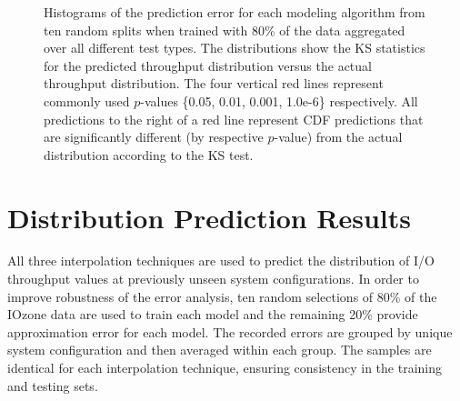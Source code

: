 
\begin{figure}
  \centering
  \caption{Histograms of the prediction error for each modeling algorithm from ten random splits when trained with 80\% of the data aggregated over all different test types. The distributions show the KS statistics for the predicted throughput distribution versus the actual throughput distribution. The four vertical red lines represent commonly used $p$-values \{0.05, 0.01, 0.001, 1.0e-6\} respectively. All predictions to the right of a red line represent CDF predictions that are significantly different (by respective $p$-value) from the actual distribution according to the KS test.}
  \label{fig:ks_histogram_80_20}
\end{figure}

\section{Distribution Prediction Results}

All three interpolation techniques are used to predict the distribution of I/O throughput values at previously unseen system configurations. In order to improve robustness of the error analysis, ten random selections of 80\% of the IOzone data are used to train each model and the remaining 20\% provide approximation error for each model. The recorded errors are grouped by unique system configuration and then averaged within each group. The samples are identical for each interpolation technique, ensuring consistency in the training and testing sets.


